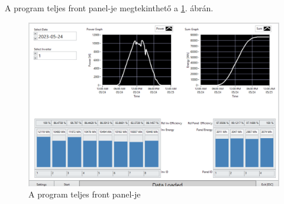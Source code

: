 A program teljes front panel-je megtekinthető a \ref{fig:fp}. ábrán.
\begin{figure}[H]
  \centering
  \includegraphics[width=\textwidth]{static/windows-fp.png}
  \caption{A program teljes front panel-je}
  \label{fig:fp}
\end{figure}
